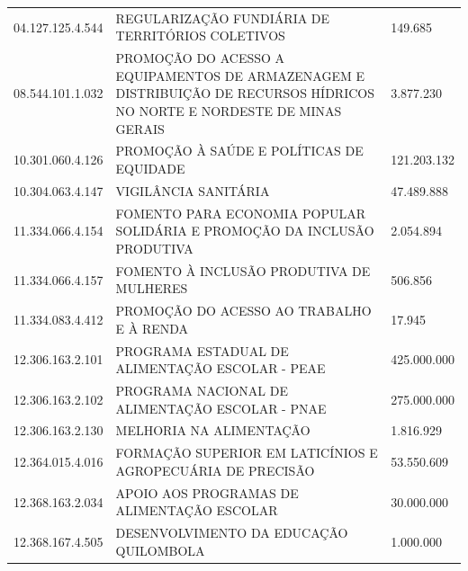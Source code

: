 \documentclass{article}
\begin{document}
\begin{longtable}[c]{m{3cm}|m{12cm}|m{2cm}}
\multicolumn{1}{C{3cm}|}{04.127.125.4.544} & \multicolumn{1}{L{12cm}|}{REGULARIZAÇÃO FUNDIÁRIA DE TERRITÓRIOS COLETIVOS} & \multicolumn{1}{R{2cm}}{149.685} \\
\multicolumn{1}{C{3cm}|}{08.544.101.1.032} & \multicolumn{1}{L{12cm}|}{PROMOÇÃO DO ACESSO A EQUIPAMENTOS DE ARMAZENAGEM E DISTRIBUIÇÃO DE RECURSOS HÍDRICOS NO NORTE E NORDESTE DE MINAS GERAIS} & \multicolumn{1}{R{2cm}}{3.877.230} \\
\multicolumn{1}{C{3cm}|}{10.301.060.4.126} & \multicolumn{1}{L{12cm}|}{PROMOÇÃO À SAÚDE E POLÍTICAS DE EQUIDADE} & \multicolumn{1}{R{2cm}}{121.203.132} \\
\multicolumn{1}{C{3cm}|}{10.304.063.4.147} & \multicolumn{1}{L{12cm}|}{VIGILÂNCIA SANITÁRIA} & \multicolumn{1}{R{2cm}}{47.489.888} \\
\multicolumn{1}{C{3cm}|}{11.334.066.4.154} & \multicolumn{1}{L{12cm}|}{FOMENTO PARA ECONOMIA POPULAR SOLIDÁRIA E PROMOÇÃO DA INCLUSÃO PRODUTIVA} & \multicolumn{1}{R{2cm}}{2.054.894} \\
\multicolumn{1}{C{3cm}|}{11.334.066.4.157} & \multicolumn{1}{L{12cm}|}{FOMENTO À INCLUSÃO PRODUTIVA DE MULHERES} & \multicolumn{1}{R{2cm}}{506.856} \\
\multicolumn{1}{C{3cm}|}{11.334.083.4.412} & \multicolumn{1}{L{12cm}|}{PROMOÇÃO DO ACESSO AO TRABALHO E À RENDA} & \multicolumn{1}{R{2cm}}{17.945} \\
\multicolumn{1}{C{3cm}|}{12.306.163.2.101} & \multicolumn{1}{L{12cm}|}{PROGRAMA ESTADUAL DE ALIMENTAÇÃO ESCOLAR - PEAE} & \multicolumn{1}{R{2cm}}{425.000.000} \\
\multicolumn{1}{C{3cm}|}{12.306.163.2.102} & \multicolumn{1}{L{12cm}|}{PROGRAMA NACIONAL DE ALIMENTAÇÃO ESCOLAR - PNAE} & \multicolumn{1}{R{2cm}}{275.000.000} \\
\multicolumn{1}{C{3cm}|}{12.306.163.2.130} & \multicolumn{1}{L{12cm}|}{MELHORIA NA ALIMENTAÇÃO} & \multicolumn{1}{R{2cm}}{1.816.929} \\
\multicolumn{1}{C{3cm}|}{12.364.015.4.016} & \multicolumn{1}{L{12cm}|}{FORMAÇÃO SUPERIOR EM LATICÍNIOS E AGROPECUÁRIA DE PRECISÃO} & \multicolumn{1}{R{2cm}}{53.550.609} \\
\multicolumn{1}{C{3cm}|}{12.368.163.2.034} & \multicolumn{1}{L{12cm}|}{APOIO AOS PROGRAMAS DE ALIMENTAÇÃO ESCOLAR} & \multicolumn{1}{R{2cm}}{30.000.000} \\
\multicolumn{1}{C{3cm}|}{12.368.167.4.505} & \multicolumn{1}{L{12cm}|}{DESENVOLVIMENTO DA EDUCAÇÃO QUILOMBOLA} & \multicolumn{1}{R{2cm}}{1.000.000} \\

\end{longtable}
\end{document}
